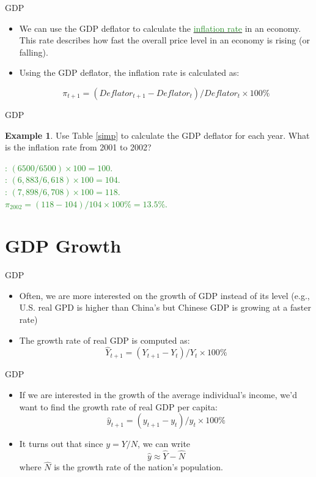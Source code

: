 \documentclass[xcolor={dvipsnames},pdf, hyperref={colorlinks=true, citecolor=ForestGreen, linkcolor=BlueViolet, urlcolor=Magenta}]{beamer}
\theoremstyle{definition}
\newtheorem{exmp}{Example}[section]
\newcommand{\ddp}[1]{{\textcolor{ForestGreen}{#1}}}
\newcommand{\dd}[1]{{\underline{\textcolor{ForestGreen}{#1}}}}
\begin{document}
\begin{frame}{GDP}
\begin{itemize}
	\item We can use the GDP deflator to calculate the \dd{inflation rate} in an economy. This rate describes how fast the overall price level in an economy is rising (or falling). 
	\item Using the GDP deflator, the inflation rate is calculated as:
	
	\[\pi_{t+1} = (Deflator_{t+1} - Deflator_t)/Deflator_t \times 100\%\]
	
	
\end{itemize}
\end{frame}

\begin{frame}{GDP}
\begin{exmp} 
	Use Table \ref{simp} to calculate the GDP deflator for each year. What is the inflation rate from 2001 to 2002?
\end{exmp}
\ddp{: $(6500/6500)\times 100 = 100$. \\
	: $(6,883/6,618)\times 100 = 104$. \\
	\pause 2002: $(7,898/6,708)\times 100 = 118$. \\
	\pause $\pi_{2002} = (118-104)/104\times 100\% = 13.5\%$.}
\end{frame}

\section{GDP Growth}

\begin{frame}{GDP}
\begin{itemize}
	\item Often, we are more interested on the growth of GDP instead of its level (e.g., U.S. real GPD is higher than China's but Chinese GDP is growing at a faster rate)
	\item The growth rate of real GDP is computed as:
	 \[\hat{Y}_{t+1} = (Y_{t+1} - Y_t)/Y_t \times 100\%\]

\end{itemize}
\end{frame}

\begin{frame}{GDP}
\begin{itemize}

	\item If we are interested in the growth of the average individual's income, we'd want to find the growth rate of real GDP per capita:
	\[\hat{y}_{t+1} = (y_{t+1} - y_t)/y_t \times 100\%\]
	\item It turns out that since $y = Y/N$, we can write 
	\[\hat{y} \approx \hat{Y} - \hat{N}\]
	where $\hat{N}$ is the growth rate of the nation's population.
\end{itemize}
\end{frame}
\end{document}
